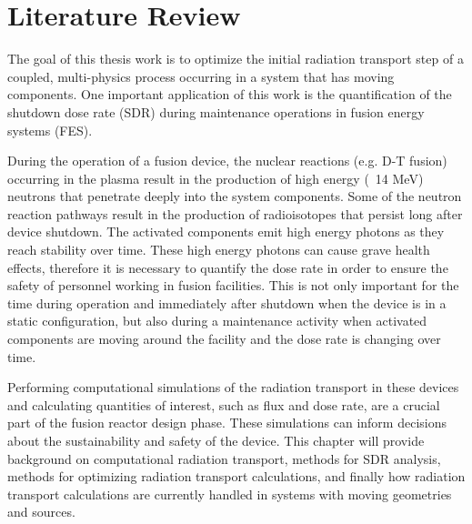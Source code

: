 \chapter{Literature Review} \label{ch:litrev}

The goal of this thesis work is to optimize the initial radiation transport step of a
coupled, multi-physics process occurring in a system that has moving components.  One
important application of this work is the quantification of the shutdown dose
rate (SDR) during maintenance operations in fusion energy systems (FES).

During the operation of a fusion device, the nuclear reactions (e.g. D-T
fusion) occurring in the plasma result in the production of high energy (~14 MeV) neutrons
that penetrate deeply into the system components.  Some of the neutron reaction
pathways result in the production of radioisotopes that persist long after
device shutdown.  The activated components emit high energy photons as they
reach stability over time.  These high energy photons
can cause grave health effects, therefore it is necessary to     
quantify the dose rate in order to ensure the safety of personnel working in
fusion facilities.  This is not only important for the time during operation
and immediately after shutdown when the device is in a static configuration,
but also during a maintenance activity when activated
components are moving around the facility and the dose rate is changing over
time.

Performing computational simulations of the radiation transport in these
devices and calculating quantities of interest, such as flux and dose rate, are
a crucial part of the fusion reactor design phase.  These simulations can
inform decisions about the sustainability and safety of the device.  
This chapter will provide background on computational radiation
transport, methods for SDR analysis, methods for optimizing radiation transport
calculations, and finally  how radiation transport calculations are currently
handled in systems with moving geometries and sources.





